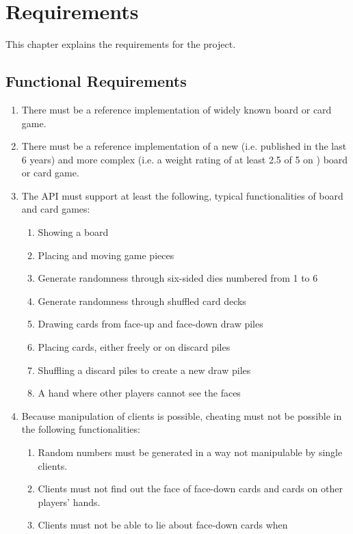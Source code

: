 \chapter{Requirements}

This chapter explains the requirements for the project.

\section{Functional Requirements}

\begin{enumerate}
  \item There must be a reference implementation of widely known board or card
  game.
  \item There must be a reference implementation of a new (i.e. published in
  the last 6 years) and more complex (i.e. a weight rating of at least 2.5 of 5
  on \cite{BGG}) board or card game.
  \item The API must support at least the following, typical functionalities of
  board and card games:
  \begin{enumerate}
    \item Showing a board
    \item Placing and moving game pieces
    \item Generate randomness through six-sided \glspl{die} numbered from 1 to 6
    \item Generate randomness through shuffled card \glspl{deck}
    \item Drawing cards from \gls{face}-up and \gls{face}-down
    \glspl{draw pile}
    \item Placing cards, either freely or on \glspl{discard pile}
    \item Shuffling a \glspl{discard pile} to create a new \glspl{draw pile}
    \item A \gls{hand} where other players cannot see the \glspl{face}
  \end{enumerate}
  \item Because manipulation of clients is possible, cheating must not be
  possible in the following functionalities:
  \begin{enumerate}
    \item Random numbers must be generated in a way not manipulable by single
    clients.
    \item Clients must not find out the \gls{face} of \gls{face}-down cards and
    cards on other players' \glspl{hand}.
    \item Clients must not be able to lie about \gls{face}-down cards when

\end{enumerate}
\end{enumerate}
